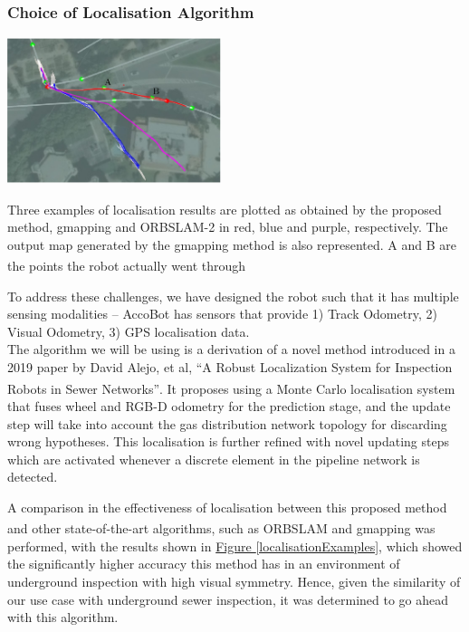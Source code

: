 \documentclass[11pt]{article}		%
\newcommand{\supercite}[1]{\textsuperscript{\cite{#1}}}		%
\newcommand{\figref}[1]{\hyperref[#1]{Figure \ref*{#1}}}    %
\begin{document}
		\subsubsection{Choice of Localisation Algorithm}
        		
		\begin{floatingfigure}[r]{0.5\textwidth}
				\centering
				\includegraphics[width=0.47\textwidth]{localisationalgocomparison.jpg}
				\caption{Three examples of localisation results are plotted as obtained by the proposed method, gmapping and ORBSLAM-2 in red, blue and purple, respectively. The output map generated by the gmapping method is also represented. A and B are the points the robot actually went through\supercite{ELFTransmitter}}
				\label{localisationExamples}
		\end{floatingfigure}
		To address these challenges, we have designed the robot such that it has multiple sensing modalities – AccoBot has sensors that provide 1) Track Odometry, 2) Visual Odometry, 3) GPS localisation data.
		\\
        \hspace*{3ex}The algorithm we will be using is a derivation of a novel method introduced in a 2019 paper by David Alejo, et al, “A Robust Localization System for Inspection Robots in Sewer Networks”\supercite{sewerpaper}. It proposes using a Monte Carlo localisation system that fuses wheel and RGB-D odometry for the prediction stage, and the update step will take into account the gas distribution network topology for discarding wrong hypotheses. This localisation is further refined with novel updating steps which are activated whenever a discrete element in the pipeline network is detected.
                		
		\begin{floatingfigure}[r]{0pt} \end{floatingfigure}
        
        \hspace*{3ex}A comparison in the effectiveness of localisation between this proposed method and other state-of-the-art algorithms, such as ORBSLAM\supercite{ORBSLAM} and gmapping\supercite{gmapping} was performed, with the results shown in \figref{localisationExamples}, which showed the significantly higher accuracy this method has in an environment of underground inspection with high visual symmetry. Hence, given the similarity of our use case with underground sewer inspection, it was determined to go ahead with this algorithm.
	
\end{document}
